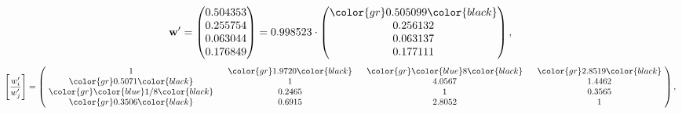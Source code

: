 \begin{example}
\begin{equation*}
\mathbf{w}^{\prime} =
\begin{pmatrix}
0.504353\\
0.255754\\
0.063044\\
0.176849
\end{pmatrix} =
0.998523\cdot
\begin{pmatrix}
\color{gr} 0.505099\color{black} \\
0.256132\\
0.063137\\
0.177111
\end{pmatrix},
\end{equation*}
\begin{equation*}
\left[ \frac{{w}^{\prime}_i}{{w}^{\prime}_j} \right] =
\begin{pmatrix}
$\,\,$ 1 $\,\,$ & $\,\,$\color{gr} 1.9720\color{black} $\,\,$ & $\,\,$\color{gr} \color{blue} 8\color{black} $\,\,$ & $\,\,$\color{gr} 2.8519\color{black} $\,\,$ \\
$\,\,$\color{gr} 0.5071\color{black} $\,\,$ & $\,\,$ 1 $\,\,$ & $\,\,$4.0567$\,\,$ & $\,\,$1.4462  $\,\,$ \\
$\,\,$\color{gr} \color{blue}  1/8\color{black} $\,\,$ & $\,\,$0.2465$\,\,$ & $\,\,$ 1 $\,\,$ & $\,\,$0.3565 $\,\,$ \\
$\,\,$\color{gr} 0.3506\color{black} $\,\,$ & $\,\,$0.6915$\,\,$ & $\,\,$2.8052$\,\,$ & $\,\,$ 1  $\,\,$ \\
\end{pmatrix},
\end{equation*}
\end{example}
\newpage
